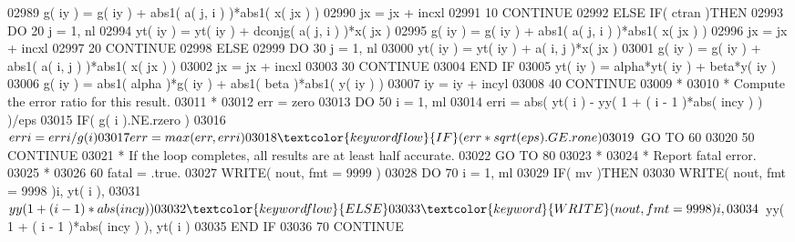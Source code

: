 \begin{DoxyCode}
02989                g( iy ) = g( iy ) + abs1( a( j, i ) )*abs1( x( jx ) )
02990                jx = jx + incxl
02991    10       \textcolor{keywordflow}{CONTINUE}
02992          \textcolor{keywordflow}{ELSE} \textcolor{keywordflow}{IF}( ctran )\textcolor{keywordflow}{THEN}
02993             \textcolor{keywordflow}{DO} 20 j = 1, nl
02994                yt( iy ) = yt( iy ) + dconjg( a( j, i ) )*x( jx )
02995                g( iy ) = g( iy ) + abs1( a( j, i ) )*abs1( x( jx ) )
02996                jx = jx + incxl
02997    20       \textcolor{keywordflow}{CONTINUE}
02998          \textcolor{keywordflow}{ELSE}
02999             \textcolor{keywordflow}{DO} 30 j = 1, nl
03000                yt( iy ) = yt( iy ) + a( i, j )*x( jx )
03001                g( iy ) = g( iy ) + abs1( a( i, j ) )*abs1( x( jx ) )
03002                jx = jx + incxl
03003    30       \textcolor{keywordflow}{CONTINUE}
03004 \textcolor{keywordflow}{         END IF}
03005          yt( iy ) = alpha*yt( iy ) + beta*y( iy )
03006          g( iy ) = abs1( alpha )*g( iy ) + abs1( beta )*abs1( y( iy ) )
03007          iy = iy + incyl
03008    40 \textcolor{keywordflow}{CONTINUE}
03009 \textcolor{comment}{*}
03010 \textcolor{comment}{*     Compute the error ratio for this result.}
03011 \textcolor{comment}{*}
03012       err = zero
03013       \textcolor{keywordflow}{DO} 50 i = 1, ml
03014          erri = abs( yt( i ) - yy( 1 + ( i - 1 )*abs( incy ) ) )/eps
03015          \textcolor{keywordflow}{IF}( g( i ).NE.rzero )
03016      $      erri = erri/g( i )
03017          err = max( err, erri )
03018          \textcolor{keywordflow}{IF}( err*sqrt( eps ).GE.rone )
03019      $      \textcolor{keywordflow}{GO TO} 60
03020    50 \textcolor{keywordflow}{CONTINUE}
03021 \textcolor{comment}{*     If the loop completes, all results are at least half accurate.}
03022       \textcolor{keywordflow}{GO TO} 80
03023 \textcolor{comment}{*}
03024 \textcolor{comment}{*     Report fatal error.}
03025 \textcolor{comment}{*}
03026    60 fatal = .true.
03027       \textcolor{keyword}{WRITE}( nout, fmt = 9999 )
03028       \textcolor{keywordflow}{DO} 70 i = 1, ml
03029          \textcolor{keywordflow}{IF}( mv )\textcolor{keywordflow}{THEN}
03030             \textcolor{keyword}{WRITE}( nout, fmt = 9998 )i, yt( i ),
03031      $         yy( 1 + ( i - 1 )*abs( incy ) )
03032          \textcolor{keywordflow}{ELSE}
03033             \textcolor{keyword}{WRITE}( nout, fmt = 9998 )i,
03034      $         yy( 1 + ( i - 1 )*abs( incy ) ), yt( i )
03035 \textcolor{keywordflow}{         END IF}
03036    70 \textcolor{keywordflow}{CONTINUE}

\end{DoxyCode}
